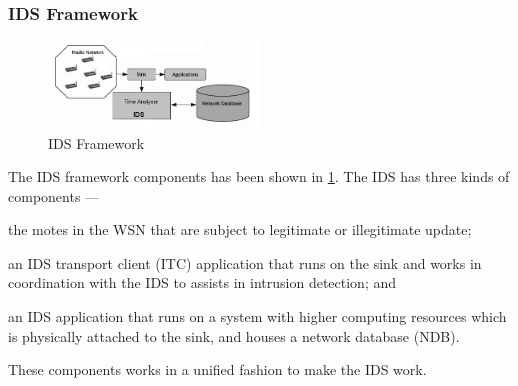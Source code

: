 \documentclass[conference,final]{IEEEtran}
\begin{document}
\subsubsection{IDS Framework}
\label{ssc:ids_fw}

\begin{figure}[btp]
    \centering
    \includegraphics[width=0.5\textwidth]{IDS_fw}	
    \caption{IDS Framework}
    \label{fig:ids_fw}
\end{figure}
The IDS framework components has been shown in \ref{fig:ids_fw}.
The IDS has three kinds of components --- 
\begin{inparaenum}
\item the motes in the WSN that are subject to legitimate or illegitimate update; 
\item an IDS transport client (ITC) application that runs on the sink and works in coordination with the IDS to assists in intrusion detection; and
\item an IDS application that runs on a system with higher computing resources which is physically attached to the sink, and houses a network database (NDB).
\end{inparaenum}
These components works in a unified fashion to make the IDS work.
\end{document}
